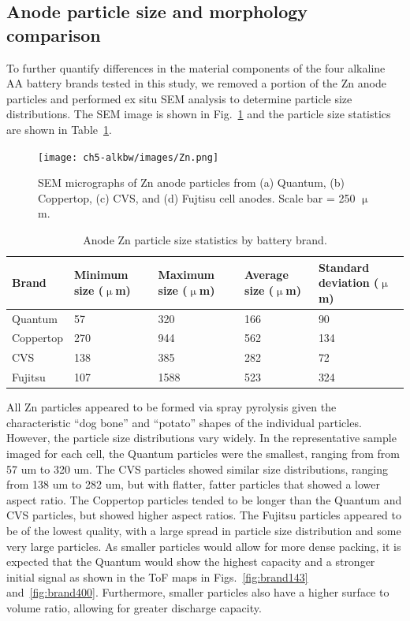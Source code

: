 \subsection{Anode particle size and morphology comparison}

To further quantify differences in the material components of the four alkaline AA battery brands tested in this study, we removed a portion of the Zn anode particles and performed ex situ SEM analysis to determine particle size distributions. The SEM image is shown in Fig.~\ref{fig:znpart} and the particle size statistics are shown in Table~\ref{tab:zntable}.

\begin{figure}[htb]
  \centering
    \texttt{[image: ch5-alkbw/images/Zn.png]}
    \caption[SEM micrographs of Zn anode particles from multiple brands of alkaline AA batteries.]{SEM micrographs of Zn anode particles from (a) Quantum, (b) Coppertop, (c) CVS, and (d) Fujtisu cell anodes. Scale bar = 250 $\upmu$m.}
    \label{fig:znpart}
\end{figure}

\begin{table}[htb]
\centering
  \caption{\label{tab:zntable}Anode Zn particle size statistics by battery brand.}
  \begin{tabular}[t]{*{5}{l}}
    \hline
       Brand & \specialcell{Minimum size\\($\upmu$m)} & \specialcell{Maximum size\\($\upmu$m)} & \specialcell{Average size\\($\upmu$m)} & \specialcell{Standard deviation\\($\upmu$m)}\\
    \hline
        Quantum & 57 & 320 & 166 & 90\\
        Coppertop & 270 & 944 & 562 & 134\\
        CVS & 138 & 385 & 282 & 72\\
        Fujitsu & 107 & 1588 & 523 & 324\\
  \end{tabular}
\end{table}

All Zn particles appeared to be formed via spray pyrolysis given the characteristic “dog bone” and “potato” shapes of the individual particles.~\cite{linden} However, the particle size distributions vary widely. In the representative sample imaged for each cell, the Quantum particles were the smallest, ranging from from 57 um to 320 um. The CVS particles showed similar size distributions, ranging from 138 um to 282 um, but with flatter, fatter particles that showed a lower aspect ratio. The Coppertop particles tended to be longer than the Quantum and CVS particles, but showed higher aspect ratios. The Fujitsu particles appeared to be of the lowest quality, with a large spread in particle size distribution and some very large particles. As smaller particles would allow for more dense packing, it is expected that the Quantum would show the highest capacity and a stronger initial signal as shown in the ToF maps in Figs.~\ref{fig:brand143} and~\ref{fig:brand400}. Furthermore, smaller particles also have a higher surface to volume ratio, allowing for greater discharge capacity. 

